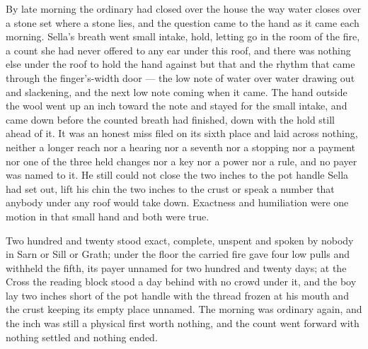 By late morning the ordinary had closed over the house the way water closes over a stone set where a stone lies, and the question came to the hand as it came each morning. Sella's breath went small intake, hold, letting go in the room of the fire, a count she had never offered to any ear under this roof, and there was nothing else under the roof to hold the hand against but that and the rhythm that came through the finger's-width door --- the low note of water over water drawing out and slackening, and the next low note coming when it came. The hand outside the wool went up an inch toward the note and stayed for the small intake, and came down before the counted breath had finished, down with the hold still ahead of it. It was an honest miss filed on its sixth place and laid across nothing, neither a longer reach nor a hearing nor a seventh nor a stopping nor a payment nor one of the three held changes nor a key nor a power nor a rule, and no payer was named to it. He still could not close the two inches to the pot handle Sella had set out, lift his chin the two inches to the crust or speak a number that anybody under any roof would take down. Exactness and humiliation were one motion in that small hand and both were true.

Two hundred and twenty stood exact, complete, unspent and spoken by nobody in Sarn or Sill or Grath; under the floor the carried fire gave four low pulls and withheld the fifth, its payer unnamed for two hundred and twenty days; at the Cross the reading block stood a day behind with no crowd under it, and the boy lay two inches short of the pot handle with the thread frozen at his mouth and the crust keeping its empty place unnamed. The morning was ordinary again, and the inch was still a physical first worth nothing, and the count went forward with nothing settled and nothing ended.
